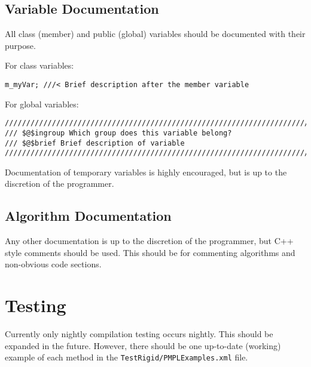\documentclass[12pt]{article}
\begin{document}
\subsection{Variable Documentation}

All class (member) and public (global) variables should be documented with their
purpose.

For class variables:
\begin{lstlisting}
m_myVar; ///< Brief description after the member variable
\end{lstlisting}

For global variables:
\begin{lstlisting}[mathescape]
///////////////////////////////////////////////////////////////////////////////
/// $@$ingroup Which group does this variable belong?
/// $@$brief Brief description of variable
///////////////////////////////////////////////////////////////////////////////
\end{lstlisting}

Documentation of temporary variables is highly encouraged, but is up to the
discretion of the programmer.

\subsection{Algorithm Documentation}

Any other documentation is up to the discretion of the programmer, but C++ style
comments should be used. This should be for commenting algorithms and
non-obvious code sections.


\section{Testing}
Currently only nightly compilation testing occurs nightly. This should be
expanded in the future. However, there should be one up-to-date (working)
example of each method in the \texttt{TestRigid/PMPLExamples.xml} file.
\end{document}
